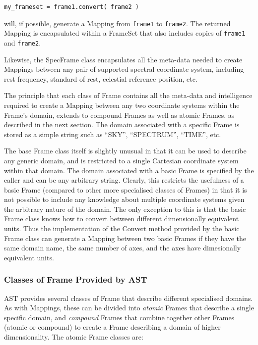 \documentclass[final,authoryear,5p,times,twocolumn]{elsarticle}
\begin{document}
\begin{lstlisting}
my_frameset = frame1.convert( frame2 )
\end{lstlisting}

will, if possible, generate a Mapping from \texttt{frame1} to
\texttt{frame2}. The returned Mapping is encapsulated within a FrameSet that
also includes copies of \texttt{frame1} and \texttt{frame2}.

Likewise, the SpecFrame class encapsulates all the meta-data needed to
create Mappings between any pair of supported spectral coordinate system,
including rest frequency, standard of rest, celestial reference position,
etc.

The principle that each class of Frame contains all the meta-data and
intelligence required to create a Mapping between any two coordinate
systems within the Frame's domain, extends to compound Frames as well as
atomic Frames, as described in the next section. The domain associated
with a specific Frame is stored as a simple string such as ``SKY'',
``SPECTRUM'', ``TIME'', etc.

The base Frame class itself is slightly unusual in that it can be used to
describe any generic domain, and is restricted to a single Cartesian
coordinate system within that domain. The domain associated with a basic
Frame is specified by the caller and can be any arbitrary string. Clearly,
this restricts the usefulness of a basic Frame (compared to other more
specialised classes of Frames) in that it is not possible to include any
knowledge about multiple coordinate systems given the arbitrary nature of
the domain. The only exception to this is that the basic Frame class
knows how to convert between different dimensionally equivalent units.
Thus the implementation of the Convert method provided by the basic Frame
class can generate a Mapping between two basic Frames if they have the
same domain name, the same number of axes, and the axes have dimesionally
equivalent units.

\subsubsection{Classes of Frame Provided by AST}
AST provides several classes of Frame that describe different specialised
domains. As with Mappings, these can be divided into \emph{atomic} Frames that
describe a single specific domain, and \emph{compound} Frames that combine
together other Frames (atomic or compound) to create a Frame describing a
domain of higher dimensionality. The atomic Frame classes are:
\end{document}
